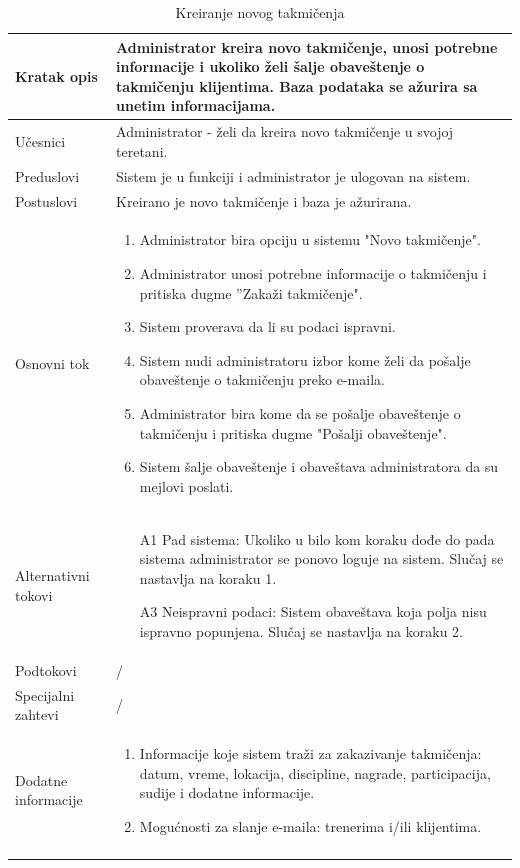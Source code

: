 \documentclass[../../main.tex]{subfiles}
\begin{document}
\begin{longtable}{| p{} | p{} |} 
\hline
    Kratak opis &  Administrator kreira novo takmičenje, unosi potrebne informacije i ukoliko želi šalje obaveštenje o takmičenju klijentima. Baza podataka se ažurira sa unetim informacijama.\\ 
\hline    
    Učesnici & Administrator - želi da kreira novo takmičenje u svojoj teretani.\\
\hline
   Preduslovi & Sistem je u funkciji i administrator je ulogovan na sistem. \\
\hline  
    Postuslovi & Kreirano je novo takmičenje i baza je ažurirana.\\
\hline
    Osnovni tok & \begin{enumerate}
        \item Administrator bira opciju u sistemu "Novo takmičenje".
        \item Administrator unosi potrebne informacije o takmičenju i pritiska dugme ''Zakaži takmičenje".
        \item Sistem proverava da li su podaci ispravni.
        \item Sistem nudi administratoru izbor kome želi da pošalje obaveštenje o takmičenju preko e-maila.
        \item Administrator bira kome da se pošalje obaveštenje o takmičenju i pritiska dugme "Pošalji obaveštenje".
        \item Sistem šalje obaveštenje i obaveštava administratora da su mejlovi poslati.
    \end{enumerate}\\
\hline
    Alternativni tokovi &  \begin{itemize}
        \item[A1] Pad sistema: Ukoliko u bilo kom koraku dođe do pada sistema administrator se ponovo loguje na sistem. Slučaj se nastavlja na koraku 1.  
        \item[A3] Neispravni podaci: Sistem obaveštava koja polja nisu ispravno popunjena. Slučaj se nastavlja na koraku 2.
    \end{itemize}\\
\hline
    Podtokovi & /\\
\hline
    Specijalni zahtevi & /\\
\hline
    Dodatne informacije & \begin{enumerate}
        \item Informacije koje sistem traži za zakazivanje takmičenja: datum, vreme, lokacija, discipline, nagrade, participacija, sudije i dodatne informacije.
        \item Mogućnosti za slanje e-maila: trenerima i/ili klijentima.
    \end{enumerate}\\
\hline
\caption{Kreiranje novog takmičenja}
\end{longtable}
\end{document}
